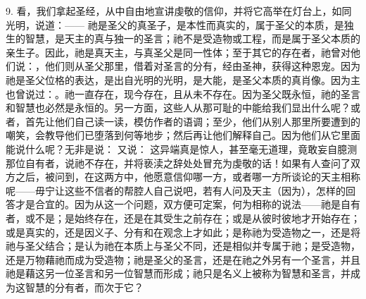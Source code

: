 9. 看，我们拿起圣经，从中自由地宣讲虔敬的信仰，并将它高举在灯台上，如同光明，说道：—— 祂是圣父的真圣子，是本性而真实的，属于圣父的本质，是独生的智慧，是天主的真与独一的圣言；祂不是受造物或工程，而是属于圣父本质的亲生子。因此，祂是真天主，与真圣父是同一性体；至于其它的存在者，祂曾对他们说：，他们则从圣父那里，借着对圣言的分有，经由圣神，获得这种恩宠。因为祂是圣父位格的表达，是出自光明的光明，是大能，是圣父本质的真肖像。因为主也曾说过：。祂一直存在，现今存在，且从未不存在。因为圣父既永恒，祂的圣言和智慧也必然是永恒的。另一方面，这些人从那可耻的中能给我们显出什么呢？或者，首先让他们自己读一读，模仿作者的语调；至少，他们从别人那里所要遭到的嘲笑，会教导他们已堕落到何等地步；然后再让他们解释自己。因为他们从它里面能说什么呢？无非是说： \newline{}又说： \newline{}这异端真是惊人，甚至毫无道理，竟敢妄自臆测那位自有者，说祂不存在，并将亵渎之辞处处冒充为虔敬的话！如果有人查问了双方之后，被问到，在这两方中，他愿意信仰哪一方，或者哪一方所谈论的天主相称呢——毋宁让这些不信者的帮腔人自己说吧，若有人问及天主（因为），怎样的回答才是合宜的。因为从这一个问题，双方便可定案，何为相称的说法——祂是自有者，或不是；是始终存在，还是在其受生之前存在；或是从彼时彼地才开始存在；或是真实的，还是因义子、分有和在观念上才如此；是称祂为受造物之一，还是将祂与圣父结合；是认为祂在本质上与圣父不同，还是相似并专属于祂；是受造物，还是万物藉祂而成为受造物；祂是圣父的圣言，还是在祂之外另有一个圣言，并且祂是藉这另一位圣言和另一位智慧而形成；祂只是名义上被称为智慧和圣言，并成为这智慧的分有者，而次于它？\par

